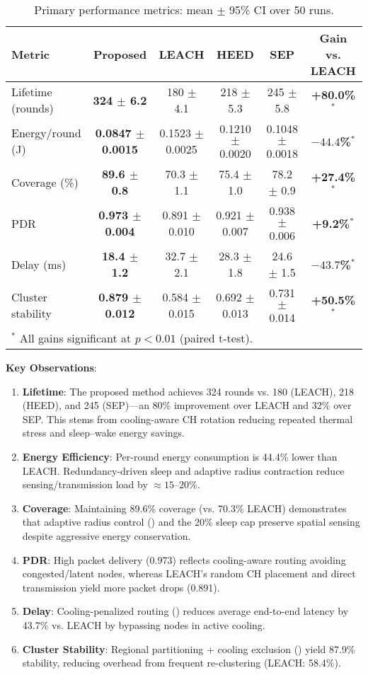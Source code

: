 \begin{table}[ht]
  \centering
  \caption{Primary performance metrics: mean $\pm$ 95\% CI over 50 runs.}
  \label{tab:main-results}
  \begin{tabular}{@{}lccccc@{}}
    \toprule
    Metric & \textbf{Proposed} & LEACH & HEED & SEP & \textbf{Gain vs. LEACH} \\
    \midrule
    Lifetime (rounds) & \textbf{324 $\pm$ 6.2} & 180 $\pm$ 4.1 & 218 $\pm$ 5.3 & 245 $\pm$ 5.8 & \textbf{+80.0\%}$^*$ \\
    Energy/round (J) & \textbf{0.0847 $\pm$ 0.0015} & 0.1523 $\pm$ 0.0025 & 0.1210 $\pm$ 0.0020 & 0.1048 $\pm$ 0.0018 & \textbf{$-44.4$\%}$^*$ \\
    Coverage (\%) & \textbf{89.6 $\pm$ 0.8} & 70.3 $\pm$ 1.1 & 75.4 $\pm$ 1.0 & 78.2 $\pm$ 0.9 & \textbf{+27.4\%}$^*$ \\
    PDR & \textbf{0.973 $\pm$ 0.004} & 0.891 $\pm$ 0.010 & 0.921 $\pm$ 0.007 & 0.938 $\pm$ 0.006 & \textbf{+9.2\%}$^*$ \\
    Delay (ms) & \textbf{18.4 $\pm$ 1.2} & 32.7 $\pm$ 2.1 & 28.3 $\pm$ 1.8 & 24.6 $\pm$ 1.5 & \textbf{$-43.7$\%}$^*$ \\
    Cluster stability & \textbf{0.879 $\pm$ 0.012} & 0.584 $\pm$ 0.015 & 0.692 $\pm$ 0.013 & 0.731 $\pm$ 0.014 & \textbf{+50.5\%}$^*$ \\
    \bottomrule
    \multicolumn{6}{l}{\footnotesize $^*$ All gains significant at $p<0.01$ (paired t-test).}
  \end{tabular}
\end{table}

\textbf{Key Observations}:
\begin{enumerate}[label=\arabic*.,noitemsep]
  \item \textbf{Lifetime}: The proposed method achieves 324 rounds vs. 180 (LEACH), 218 (HEED), and 245 (SEP)—an 80\% improvement over LEACH and 32\% over SEP. This stems from cooling-aware CH rotation reducing repeated thermal stress and sleep--wake energy savings.
  \item \textbf{Energy Efficiency}: Per-round energy consumption is 44.4\% lower than LEACH. Redundancy-driven sleep and adaptive radius contraction reduce sensing/transmission load by $\approx 15$--20\%.
  \item \textbf{Coverage}: Maintaining 89.6\% coverage (vs. 70.3\% LEACH) demonstrates that adaptive radius control () and the 20\% sleep cap preserve spatial sensing despite aggressive energy conservation.
  \item \textbf{PDR}: High packet delivery (0.973) reflects cooling-aware routing avoiding congested/latent nodes, whereas LEACH's random CH placement and direct transmission yield more packet drops (0.891).
  \item \textbf{Delay}: Cooling-penalized routing () reduces average end-to-end latency by 43.7\% vs. LEACH by bypassing nodes in active cooling.
  \item \textbf{Cluster Stability}: Regional partitioning + cooling exclusion () yield 87.9\% stability, reducing overhead from frequent re-clustering (LEACH: 58.4\%).
\end{enumerate}

